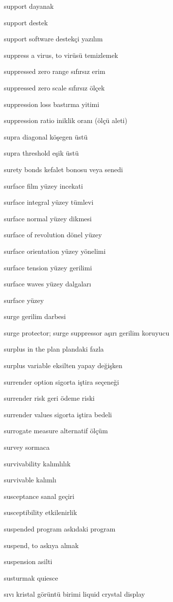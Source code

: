\documentclass[12pt,fleqn]{article}\usepackage{../../common}
\begin{document}
support dayanak

support destek

support software destekçi yazılım

suppress a virus, to virüsü temizlemek

suppressed zero range sıfırsız erim

suppressed zero scale sıfırsız ölçek

suppression loss bastırma yitimi

suppression ratio iniklik oranı (ölçü aleti)

supra diagonal köşegen üstü

supra threshold eşik üstü

surety bonds kefalet bonosu veya senedi

surface film yüzey incekati

surface integral yüzey tümlevi

surface normal yüzey dikmesi

surface of revolution dönel yüzey

surface orientation yüzey yönelimi

surface tension yüzey gerilimi

surface waves yüzey dalgaları

surface yüzey

surge gerilim darbesi

surge protector; surge suppressor aşırı gerilim koruyucu

surplus in the plan plandaki fazla

surplus variable eksilten yapay değişken

surrender option sigorta iştira seçeneği

surrender risk geri ödeme riski

surrender values sigorta iştira bedeli

surrogate measure alternatif ölçüm

survey sormaca

survivability kalımlılık

survivable kalımlı

susceptance sanal geçiri

susceptibility etkilenirlik

suspended program askıdaki program

suspend, to askıya almak

suspension asilti

susturmak quiesce

sıvı kristal görüntü birimi liquid crystal display
\end{document}
